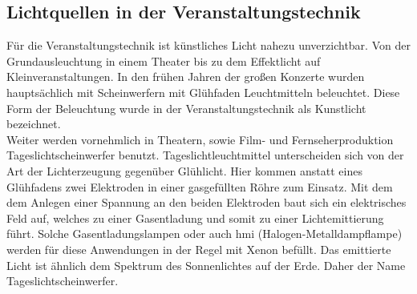 \documentclass[11pt]{scrartcl}
\begin{document}
\subsection{Lichtquellen in der Veranstaltungstechnik}
Für die Veranstaltungstechnik ist künstliches Licht nahezu unverzichtbar. Von der Grundausleuchtung in einem Theater bis zu dem Effektlicht
auf Kleinveranstaltungen. In den frühen Jahren der großen Konzerte wurden hauptsächlich mit Scheinwerfern mit Glühfaden Leuchtmitteln beleuchtet.
Diese Form der Beleuchtung wurde in der Veranstaltungstechnik als Kunstlicht bezeichnet.\\
Weiter werden vornehmlich in Theatern, sowie Film- und Fernseherproduktion Tageslichtscheinwerfer benutzt. Tageslichtleuchtmittel
unterscheiden sich von der Art der Lichterzeugung gegenüber Glühlicht. Hier kommen anstatt eines Glühfadens zwei Elektroden in einer
gasgefüllten Röhre zum Einsatz. Mit dem dem Anlegen einer Spannung an den beiden Elektroden baut sich ein elektrisches Feld auf, welches zu
einer Gasentladung und somit zu einer Lichtemittierung führt. Solche Gasentladungslampen oder auch \ac{hmi} (Halogen-Metalldampflampe)
werden für diese Anwendungen in der Regel mit Xenon befüllt. Das emittierte Licht ist ähnlich dem Spektrum des Sonnenlichtes auf der
Erde. Daher der Name Tageslichtscheinwerfer.
\end{document}
